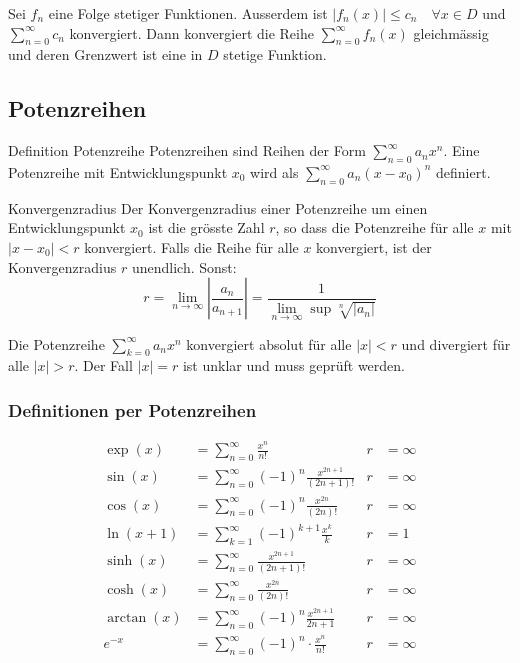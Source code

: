 \documentclass[a4paper,10pt]{article}
\def\limn{\lim_{n\to \infty}}
\def\sumk{\sum_{k=1}^\infty}
\def\sumn{\sum_{n=0}^\infty}
\begin{document}
\begin{subbox}{}
 Sei $f_n$ eine Folge stetiger Funktionen. Ausserdem ist $|f_n(x)| \le c_n \quad \forall x \in D$ und $\sum_{n=0}^\infty c_n$ konvergiert. Dann konvergiert die Reihe $\sum_{n=0}^\infty f_n(x)$ gleichmässig und deren Grenzwert ist eine in $D$ stetige Funktion.
\end{subbox}

\subsection{Potenzreihen}
\begin{subbox}{Definition Potenzreihe}
 Potenzreihen sind Reihen der Form $\sum_{n=0}^\infty a_n x^n$. Eine Potenzreihe mit Entwicklungspunkt $x_0$ wird als $\sum_{n=0}^\infty a_n(x-x_0)^n$ definiert.
\end{subbox}

\begin{mainbox}{Konvergenzradius}
 Der Konvergenzradius einer Potenzreihe um einen Entwicklungspunkt $x_0$ ist die grösste Zahl $r$, so dass die Potenzreihe für alle $x$ mit $|x - x_0| < r$ konvergiert. Falls die Reihe für alle $x$ konvergiert, ist der Konvergenzradius $r$ unendlich. Sonst:
 $$r = \limn \left| \frac{a_n}{a_{n+1}} \right| = \frac{1}{\limn\sup \sqrt[n]{|a_n|}} $$
\end{mainbox}
Die Potenzreihe $\sum_{k=0}^\infty a_n x^n$ konvergiert absolut für alle $|x| < r$ und divergiert für alle $|x| > r$. Der Fall $|x| = r$ ist unklar und muss geprüft werden.
\subsubsection{Definitionen per Potenzreihen}
\begin{align*}
\exp(x) &= \sumn \frac{x^n}{n!} & r &= \infty \\
\sin(x) &= \sumn (-1)^n \frac{x^{2n + 1}}{(2n + 1)!} & r &= \infty \\
\cos(x) &= \sumn (-1)^n \frac{x^{2n}}{(2n)!} & r &= \infty \\
\ln(x + 1) &= \sumk (-1)^{k+1} \frac{x^k}{k} & r &= 1 \\
\sinh(x) &= \sumn \frac{x^{2n+1}}{(2n+1)!} & r &= \infty \\
\cosh(x) &= \sumn \frac{x^{2n}}{(2n)!} & r &= \infty \\
\arctan(x) &= \sumn (-1)^n \frac{x^{2n+1}}{2n+1} & r &= \infty \\
e^{-x} &= \sumn (-1)^n \cdot \frac{x^n}{n!} & r &= \infty \\
\end{align*}
\end{document}
